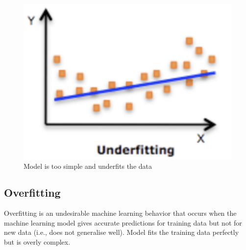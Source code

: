 \begin{figure}[H]
  \centering
  \includegraphics[scale=0.35]{images/04.png}
  \caption{Model is too simple and underfits the data}
\end{figure}

\subsection{Overfitting}
Overfitting is an undesirable machine learning behavior that occurs when the machine learning model gives accurate predictions for training data but not for new data (i.e., does not generalise well). Model fits the training data perfectly but is overly complex.

